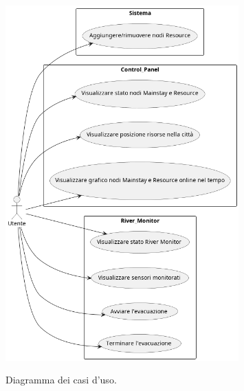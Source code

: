 \begin{figure}[H]
    \centering
    \caption{Diagramma dei casi d'uso.}
    \includegraphics[width=0.8\textwidth]{figures/use-cases-diagram.png}
    \label{fig:use-cases-diagram}
\end{figure}


